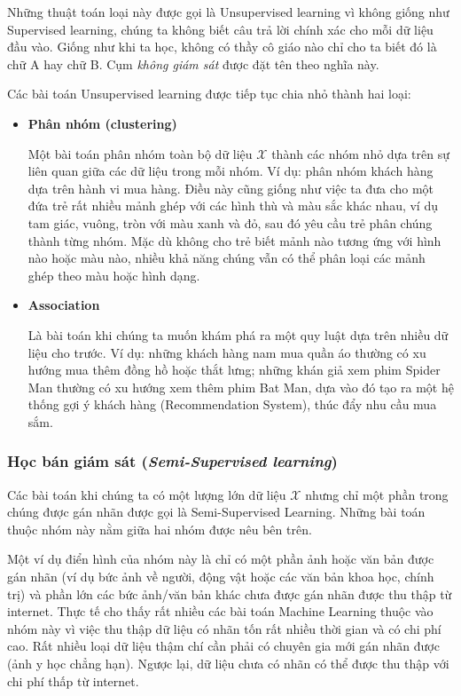 \documentclass[../main-report.tex]{subfiles}
\begin{document}
Những thuật toán loại này được gọi là Unsupervised learning vì không giống như Supervised learning, chúng ta không biết câu trả lời chính xác cho mỗi dữ liệu đầu vào. Giống như khi ta học, không có thầy cô giáo nào chỉ cho ta biết đó là chữ A hay chữ B. Cụm \emph{không giám sát} được đặt tên theo nghĩa này.

Các bài toán Unsupervised learning được tiếp tục chia nhỏ thành hai loại:

\begin{itemize}
\item \textbf{Phân nhóm (clustering)}

Một bài toán phân nhóm toàn bộ dữ liệu \(\mathcal{X}\) thành các nhóm nhỏ dựa trên sự liên quan giữa các dữ liệu trong mỗi nhóm. Ví dụ: phân nhóm khách hàng dựa trên hành vi mua hàng. Điều này cũng giống như việc ta đưa cho một đứa trẻ rất nhiều mảnh ghép với các hình thù và màu sắc khác nhau, ví dụ tam giác, vuông, tròn với màu xanh và đỏ, sau đó yêu cầu trẻ phân chúng thành từng nhóm. Mặc dù không cho trẻ biết mảnh nào tương ứng với hình nào hoặc màu nào, nhiều khả năng chúng vẫn có thể phân loại các mảnh ghép theo màu hoặc hình dạng.

\item \textbf{Association}

Là bài toán khi chúng ta muốn khám phá ra một quy luật dựa trên nhiều dữ liệu cho trước. Ví dụ: những khách hàng nam mua quần áo thường có xu hướng mua thêm đồng hồ hoặc thắt lưng; những khán giả xem phim Spider Man thường có xu hướng xem thêm phim Bat Man, dựa vào đó tạo ra một hệ thống gợi ý khách hàng (Recommendation System), thúc đẩy nhu cầu mua sắm.
\end{itemize}

\subsubsection{Học bán giám sát (\emph{Semi-Supervised learning})}
Các bài toán khi chúng ta có một lượng lớn dữ liệu \(\mathcal{X}\) nhưng chỉ một phần trong chúng được gán nhãn được gọi là Semi-Supervised Learning. Những bài toán thuộc nhóm này nằm giữa hai nhóm được nêu bên trên.

Một ví dụ điển hình của nhóm này là chỉ có một phần ảnh hoặc văn bản được gán nhãn (ví dụ bức ảnh về người, động vật hoặc các văn bản khoa học, chính trị) và phần lớn các bức ảnh/văn bản khác chưa được gán nhãn được thu thập từ internet. Thực tế cho thấy rất nhiều các bài toán Machine Learning thuộc vào nhóm này vì việc thu thập dữ liệu có nhãn tốn rất nhiều thời gian và có chi phí cao. Rất nhiều loại dữ liệu thậm chí cần phải có chuyên gia mới gán nhãn được (ảnh y học chẳng hạn). Ngược lại, dữ liệu chưa có nhãn có thể được thu thập với chi phí thấp từ internet.
\end{document}

